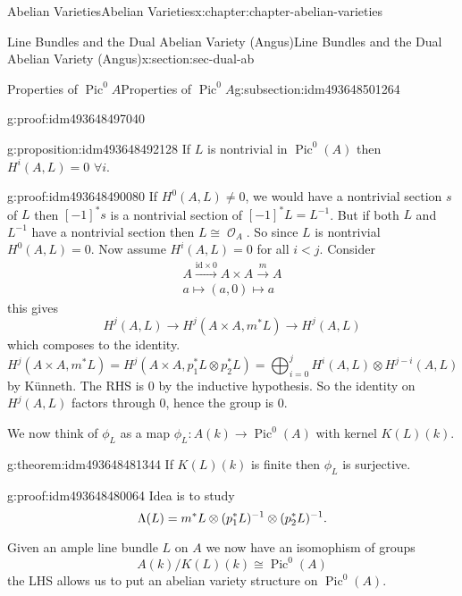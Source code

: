 \documentclass[oneside,10pt,]{book}
\newcommand{\qedhere}{\relax}
\numberwithin{equation}{section}
\newcommand{\sheaf}[1]{\operatorname{\mathcal{#1}}}
\newcommand{\lb}{[}
\newcommand{\rb}{]}
\newcommand{\id}{\mathrm{id}}
\DeclareMathOperator{\Pic}{Pic}
\newcommand{\lt}{<}
\begin{document}
\begin{chapterptx}{Abelian Varieties}{}{Abelian Varieties}{}{}{x:chapter:chapter-abelian-varieties}
\begin{sectionptx}{Line Bundles and the Dual Abelian Variety (Angus)}{}{Line Bundles and the Dual Abelian Variety (Angus)}{}{}{x:section:sec-dual-ab}
\begin{subsectionptx}{Properties of \(\Pic^0 A\)}{}{Properties of \(\Pic^0 A\)}{}{}{g:subsection:idm493648501264}
\begin{proofptx}{}{g:proof:idm493648497040}
\end{proofptx}
\begin{proposition}{}{}{g:proposition:idm493648492128}%
If \(L\) is nontrivial in \(\Pic^0(A)\) then \(H^i(A,L) = 0\) \(\forall i\).%
\end{proposition}
\begin{proofptx}{}{g:proof:idm493648490080}
If \(H^0(A,L) \ne 0\), we would have  a nontrivial section \(s\) of \(L\) then \(\lb -1\rb ^* s\) is   a nontrivial section of \(\lb-1\rb^* L = L^{-1}\). But if both \(L\) and \(L^{-1}\) have  a nontrivial section then \(L \cong \sheaf O_A\). So since \(L\) is nontrivial \(H^0(A,L) = 0\). Now assume \(H^i(A,L) = 0\) for all \(i\lt j\). Consider%
\begin{gather*}
A\xrightarrow{\id \times 0} A\times A \xrightarrow m A\\
a\mapsto (a,0)\mapsto a
\end{gather*}
this gives%
\begin{equation*}
H^j(A, L) \to H^j(A\times A, m^*L) \to H^j(A,L)
\end{equation*}
which composes to the identity.%
\begin{equation*}
H^j(A\times A, m^*L) =  H^j(A\times A, p_1^*L \otimes p_2^*L) = \bigoplus_{i=0}^j H^i(A,L) \otimes H^{j-i}(A,L)
\end{equation*}
by Künneth. The RHS is 0 by the inductive hypothesis. So the identity on \(H^j(A,L)\) factors through 0, hence the group is 0.%
\end{proofptx}
We now think of \(\phi_L\) as a map \(\phi_L \colon A(k) \to \Pic^0(A)\) with kernel \(K(L) (k)\).%
\begin{theorem}{}{}{g:theorem:idm493648481344}%
If \(K(L)(k)\) is finite then \(\phi_L\) is surjective.%
\end{theorem}
\begin{proofptx}{}{g:proof:idm493648480064}
Idea is to study%
\begin{equation*}
\Lambda (L) =  m^* L \otimes (p_1^* L)^{-1} \otimes (p_2^* L)^{-1}\text{.}\qedhere
\end{equation*}
%
\end{proofptx}
Given an ample line bundle \(L\) on \(A\) we now have an isomophism of groups%
\begin{equation*}
A(k)/K(L)(k) \cong \Pic^0(A)
\end{equation*}
the LHS allows us to put an abelian variety structure on \(\Pic^0(A)\).%
\end{subsectionptx}
%
%
\typeout{************************************************}

\end{sectionptx}
\end{chapterptx}
\end{document}
